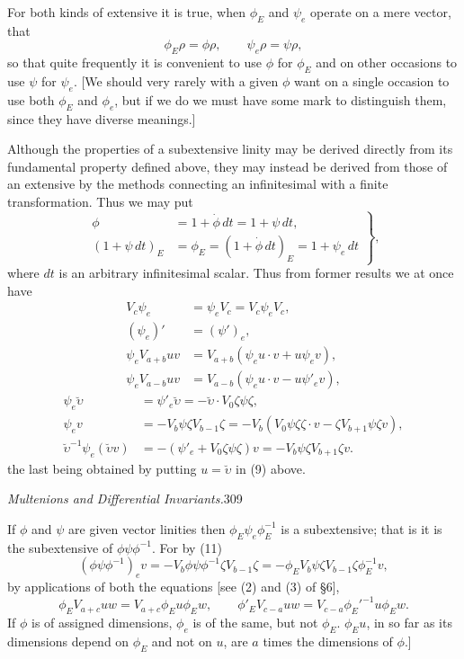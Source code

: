 \documentclass[11pt]{article}
\begin{document}
\indent For both kinds of extensive it is true, when $\phi_E$ and $\psi_e$ operate on a mere vector, that
\begin{equation}\phi_E\rho=\phi\rho,\qquad\psi_e\rho=\psi\rho,\tag{4}\end{equation}
so that quite frequently it is convenient to use $\phi$ for $\phi_E$ and on other occasions to use $\psi$ for $\psi_e$. [We should very rarely with a given $\phi$ want on a single occasion to use both $\phi_E$ and $\phi_e$, but if we do we must have some mark to distinguish them, since they have diverse meanings.]

\indent Although the properties of a subextensive linity may be derived directly from its fundamental property defined above, they may instead be derived from those of an extensive by the methods connecting an infinitesimal with a finite transformation. Thus we may put
\begin{equation}\left.\begin{aligned}\phi&=1+\dot\phi\,dt=1+\psi\,dt,\\(1+\psi\,dt)_E&=\phi_E=(1+\dot\phi\,dt)_E=1+\psi_e\,dt\end{aligned}\right\},\tag{5}\end{equation}
where $dt$ is an arbitrary infinitesimal scalar. Thus from former results we at once have
\begin{align}V_c\psi_e&=\psi_eV_c=V_c\psi_eV_c,\tag{6}\\(\psi_e)'&=(\psi')_e,\tag{7}\\\psi_eV_{a+b}uv&=V_{a+b}(\psi_eu\cdot v+u\psi_ev),\tag{8}\\\psi_eV_{a-b}uv&=V_{a-b}(\psi_eu\cdot v-u\psi'_ev),\tag{9}\end{align}
\begin{align}
\psi_e\breve\upsilon&=\psi'_e\breve\upsilon=-\breve\upsilon\cdot V_0\zeta\psi\zeta,\tag{10}\\
\psi_ev&=-V_b\psi\zeta V_{b-1}\zeta
  =-V_b(V_0\psi\zeta\zeta\cdot v-\zeta V_{b+1}\psi\zeta v),\tag{11}\\
\breve\upsilon^{-1}\psi_e(\breve\upsilon v)&=-(\psi'_e+V_0\zeta\psi\zeta)v
  =-V_b\psi\zeta V_{b+1}\zeta v.\tag{12}
\end{align}
the last being obtained by putting $u=\breve\upsilon$ in (9) above.

\newpage\thispagestyle{empty}\begin{center}\textit{Multenions and Differential Invariants.}\hfill 309\end{center}
If $\phi$ and $\psi$ are given vector linities then $\phi_E\psi_e\phi_E^{-1}$ is a subextensive; that is it is the subextensive of $\phi\psi\phi^{-1}$. For by (11)
\[(\phi\psi\phi^{-1})_ev=-V_b\phi\psi\phi^{-1}\zeta V_{b-1}\zeta
 =-\phi_EV_b\psi\zeta V_{b-1}\zeta\phi_E^{-1}v,\]
by applications of both the equations [see (2) and (3) of §6],
\[\phi_EV_{a+c}uw=V_{a+c}\phi_Eu\phi_Ew,\qquad
\phi'_EV_{c-a}uw=V_{c-a}\phi_E'^{-1}u\phi_Ew.\]
If $\phi$ is of assigned dimensions, $\phi_e$ is of the same, but not $\phi_E$. $\phi_Eu$, in so far as its dimensions depend on $\phi_E$ and not on $u$, are $a$ times the dimensions of $\phi$.]
\end{document}
